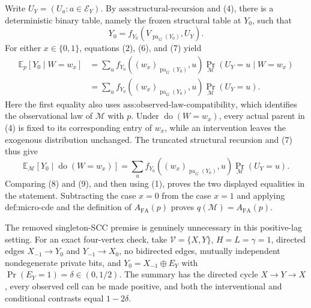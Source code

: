 Write \(U_Y=(U_a:a\in\mathcal E_Y)\). By \(\text{ass:structural-recursion}\) and (4), there is a deterministic binary table, namely the frozen structural table at \(Y_0\), such that
\[
Y_0=f_{Y_0}(V_{\operatorname{pa}_G(Y_0)},U_Y).
\tag{7}
\]
For either \(x\in\{0,1\}\), equations (2), (6), and (7) yield
\[
\begin{aligned}
\mathbb E_p[Y_0\mid W=w_x]
&=\sum_u f_{Y_0}((w_x)_{\operatorname{pa}_G(Y_0)},u)
   \Pr_{\mathcal M}(U_Y=u\mid W=w_x)\\
&=\sum_u f_{Y_0}((w_x)_{\operatorname{pa}_G(Y_0)},u)
   \Pr_{\mathcal M}(U_Y=u).
\end{aligned}
\tag{8}
\]
Here the first equality also uses \(\text{ass:observed-law-compatibility}\), which identifies the observational law of \(\mathcal M\) with \(p\). Under \(\operatorname{do}(W=w_x)\), every actual parent in (4) is fixed to its corresponding entry of \(w_x\), while an intervention leaves the exogenous distribution unchanged. The truncated structural recursion and (7) thus give
\[
\mathbb E_{\mathcal M}[Y_0\mid\operatorname{do}(W=w_x)]
=\sum_u f_{Y_0}((w_x)_{\operatorname{pa}_G(Y_0)},u)
   \Pr_{\mathcal M}(U_Y=u).
\tag{9}
\]
Comparing (8) and (9), and then using (1), proves the two displayed equalities in the statement. Subtracting the case \(x=0\) from the case \(x=1\) and applying \(\text{def:micro-cde}\) and the definition of \(A_{\mathrm{FA}}(p)\) proves \(q(\mathcal M)=A_{\mathrm{FA}}(p)\).

The removed singleton-SCC premise is genuinely unnecessary in this positive-lag setting. For an exact four-vertex check, take \(\mathcal V=\{X,Y\}\), \(H=L=\gamma=1\), directed edges \(X_{-1}\to Y_0\) and \(Y_{-1}\to X_0\), no bidirected edges, mutually independent nondegenerate private bits, and \(Y_0=X_{-1}\mathbin{\oplus}E_Y\) with \(\Pr(E_Y=1)=\delta\in(0,1/2)\). The summary has the directed cycle \(X\to Y\to X\), every observed cell can be made positive, and both the interventional and conditional contrasts equal \(1-2\delta\).

